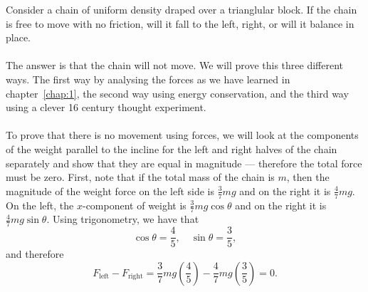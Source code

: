 \documentclass[../classical_mechanics.tex]{subfiles}
\begin{document}
        \begin{example}
            Consider a chain of uniform density draped over a trianglular block.
            If the chain is free to move with no friction, will it fall to the left, right, or will it balance in place.

            \paragraph{}
            The answer is that the chain will not move.
            We will prove this three different ways.
            The first way by analysing the forces as we have learned in chapter~\ref{chap:1}, the second way using energy conservation, and the third way using a clever 16 century thought experiment.

            \paragraph{}
            To prove that there is no movement using forces, we will look at the components of the weight parallel to the incline for the left and right halves of the chain separately and show that they are equal in magnitude --- therefore the total force must be zero.
            First, note that if the total mass of the chain is $m$, then the magnitude of the weight force on the left side is $\frac{3}{7}mg$ and on the right it is $\frac{4}{7}mg$.
            On the left, the $x$-component of weight is $\frac{3}{7}mg\cos\theta$ and on the right it is $\frac{4}{7}mg\sin\theta$.
            Using trigonometry, we have that
            \begin{equation}
                \cos\theta=\frac{4}{5},\quad\sin\theta=\frac{3}{5},
            \end{equation}
            and therefore
            \begin{equation}
                F_\text{left}-F_\text{right}=\frac{3}{7}mg(\frac{4}{5})-\frac{4}{7}mg(\frac{3}{5})=0.
            \end{equation}


\end{example}
\end{document}
